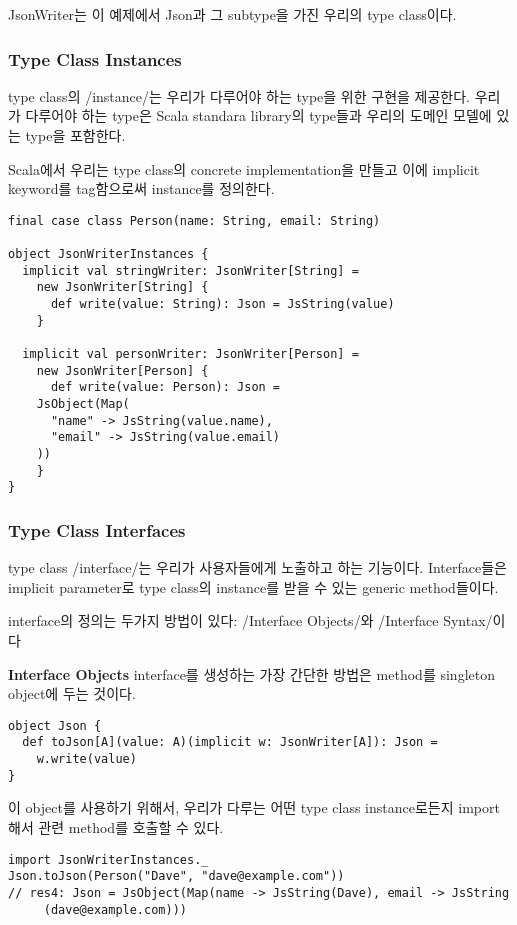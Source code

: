 \documentclass[a4paper]{article}
\begin{document}
JsonWriter는 이 예제에서 Json과 그 subtype을 가진 우리의 type class이다. 

\subsubsection{Type Class Instances}
\label{sec:orgf748dae}

type class의 /instance/는 우리가 다루어야 하는 type을 위한 구현을 제공한다. 우리가 다루어야 하는 type은 Scala standara library의 type들과 우리의 도메인 모델에 있는 type을 포함한다.

Scala에서 우리는 type class의 concrete implementation을 만들고 이에 implicit keyword를 tag함으로써 instance를 정의한다.

\begin{verbatim}
final case class Person(name: String, email: String)

object JsonWriterInstances {
  implicit val stringWriter: JsonWriter[String] = 
    new JsonWriter[String] {
      def write(value: String): Json = JsString(value)
    }

  implicit val personWriter: JsonWriter[Person] = 
    new JsonWriter[Person] {
      def write(value: Person): Json = 
	JsObject(Map(
	  "name" -> JsString(value.name),
	  "email" -> JsString(value.email)
	))
    }
}
\end{verbatim}

\subsubsection{Type Class Interfaces}
\label{sec:org415a349}

type class /interface/는 우리가 사용자들에게 노출하고 하는 기능이다. Interface들은 implicit parameter로 type class의 instance를 받을 수 있는 generic method들이다.

interface의 정의는 두가지 방법이 있다: /Interface Objects/와 /Interface Syntax/이다

\textbf{Interface Objects}
interface를 생성하는 가장 간단한 방법은 method를 singleton object에 두는 것이다. 

\begin{verbatim}
object Json {
  def toJson[A](value: A)(implicit w: JsonWriter[A]): Json =
    w.write(value)
}
\end{verbatim}

이 object를 사용하기 위해서, 우리가 다루는 어떤 type class instance로든지 import해서 관련 method를 호출할 수 있다.

\begin{verbatim}
import JsonWriterInstances._
Json.toJson(Person("Dave", "dave@example.com"))
// res4: Json = JsObject(Map(name -> JsString(Dave), email -> JsString
     (dave@example.com)))
\end{verbatim}
\end{document}
